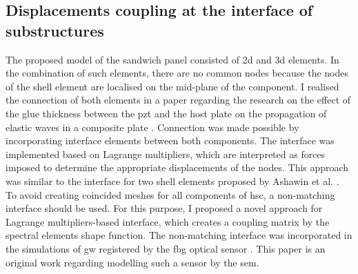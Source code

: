 \documentclass[a4paper,fleqn]{cas-dc}
\begin{document}
\subsection{Displacements coupling at the interface of substructures}
The proposed model of the sandwich panel consisted of \ac{2d} and \ac{3d} elements.
In the combination of such elements, there are no common nodes because the nodes of the shell element are localised on the mid-plane of the component.
I realised the connection of both elements in a paper regarding the research on the effect of the glue thickness between the \ac{pzt} and the host plate on the propagation of elastic waves in a composite plate \cite{fiborek20192d}.
Connection was made possible by incorporating interface elements between both components.
The interface was implemented based on Lagrange multipliers, which are interpreted as forces imposed to determine the appropriate displacements of the nodes.
This approach was similar to the interface for two shell elements proposed by Ashawin et al. \cite{ashwin2014formulation}.
To avoid creating coincided meshes for all components of \ac{hsc}, a non-matching interface should be used.
For this purpose, I proposed a novel approach for Lagrange multipliers-based interface, which creates a coupling matrix by the spectral elements shape function.
The non-matching interface was incorporated in the simulations of \ac{gw} registered by the \ac{fbg} optical sensor \cite{fiborek2022spectral}.
This paper is an original work regarding modelling such a sensor by the \ac{sem}.
\end{document}
